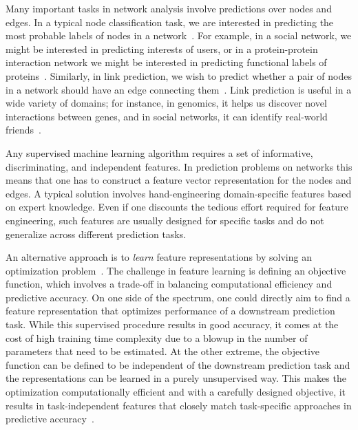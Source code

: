 
Many important tasks in network analysis involve predictions over nodes and edges. In a typical node classification task, we are interested in predicting the most probable labels of nodes in a network~\cite{tsoumakas2006multi}. For example, in a social network, we might be interested in predicting interests of users, or in a protein-protein interaction network we might be interested in predicting functional labels of proteins~\cite{radivojac2013large,yang-www2011}. Similarly, in link prediction, we wish to predict whether a pair of nodes in a network should have an edge connecting them~\cite{liben2007link}. Link prediction is useful in a wide variety of domains; for instance, in genomics, it helps us discover novel interactions between genes, and in social networks, it can identify real-world friends~\cite{srw,vazquez2003global}.

Any supervised machine learning algorithm requires a set of informative, discriminating, and independent features.
In prediction problems on networks this means that one has to construct a feature vector representation for the nodes and edges. A typical solution involves hand-engineering domain-specific features based on expert knowledge. Even if one discounts the tedious effort required for feature engineering, such features are usually designed for specific tasks and do not generalize across different prediction tasks.


An alternative approach is to 
 {\em learn} feature representations by solving an optimization problem~\cite{bengio-pami2013}. 
The challenge in feature learning is defining an objective function, which involves a trade-off in balancing computational efficiency and predictive accuracy. On one side of the spectrum, one could directly aim to find a feature representation that optimizes performance of a downstream prediction task. 
While this supervised procedure results in good accuracy, it comes at the cost of high training time complexity due to a blowup in the number of parameters that need to be estimated. At the other extreme, the objective function can be defined to be independent of the downstream prediction task and the representations can be learned in a purely unsupervised way. This makes the optimization computationally efficient and with a carefully designed objective, it results in task-independent features that closely match task-specific approaches in predictive accuracy~\cite{word2vec, pennington-emnlp2014}.

